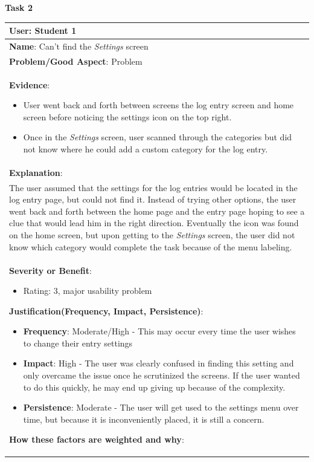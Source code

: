 \documentclass[pdftex,12pt,a4paper]{report}
\begin{document}
\textbf{Task 2}
\begin{center}
	\begin{tabular}{|p{\textwidth}|}
	\hline
	\textbf{User}: Student 1\\
	\hline
	\textbf{Name}: Can't find the \emph{Settings} screen\\
	\hline
	\textbf{Problem/Good Aspect}: Problem\\
	\hline
	\textbf{Evidence}:
	\begin{itemize}
	\item{User went back and forth between screens the log entry screen and home screen before noticing the settings icon on the top right.}
	\item{Once in the \emph{Settings} screen, user scanned through the categories but did not know where he could add a custom category for the log entry.}
	\end{itemize}\\
	\hline
	\textbf{Explanation}:\\The user assumed that the settings for the log entries would be located in the log entry page, but could not find it. Instead of trying other options, the user went back and forth between the home page and the entry page hoping to see a clue that would lead him in the right direction. Eventually the icon was found on the home screen, but upon getting to the \emph{Settings} screen, the user did not know which category would complete the task because of the menu labeling.\\
	\hline
\textbf{Severity or Benefit}:
	\begin{itemize}
	\item{Rating: 3, major usability problem}
	\end{itemize}
	\textbf{Justification(Frequency, Impact, Persistence)}:
	\begin{itemize}
	\item{\textbf{Frequency}:} Moderate/High - This may occur every time the user wishes to change their entry settings
	\item{\textbf{Impact}:} High - The user was clearly confused in finding this setting and only overcame the issue once he scrutinized the screens. If the user wanted to do this quickly, he may end up giving up because of the complexity. 
	\item{\textbf{Persistence}:} Moderate - The user will get used to the settings menu over time, but because it is inconveniently placed, it is still a concern.
	\end{itemize}
	\textbf{How these factors are weighted and why}:\\

\end{tabular}
\end{center}
\end{document}
